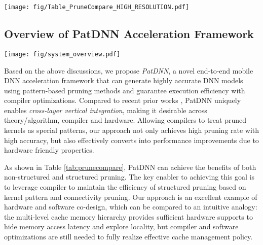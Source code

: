 \documentclass[sigplan,screen]{acmart}
\newcommand{\projectname}{PatDNN\xspace}
\begin{document}
\begin{table}\vspace{-5mm}
\caption{Qualitative comparison of different pruning schemes on accuracy and speedup under the same pruning rate.}\label{tab:prunecompare}
\centering
\texttt{[image: fig/Table\_PruneCompare\_HIGH\_RESOLUTION.pdf]}
\end{table}





\subsection{Overview of PatDNN Acceleration Framework}



\begin{figure*}\centering
    \texttt{[image: fig/system\_overview.pdf]}
    \caption{Overview of PatDNN acceleration framework.}
    \label{fig:system-overview}
\end{figure*}




Based on the above discussions, we propose
{\em \projectname}, a novel end-to-end mobile DNN acceleration framework that can generate highly accurate
DNN models using pattern-based pruning methods
and guarantee execution efficiency with 
compiler optimizations. 
Compared to recent prior works \cite{ren2019ADMMNN,he2018amc,he2017channel,wen2016learning},
\projectname uniquely enables 
{\em cross-layer vertical integration}, 
making it desirable across theory/algorithm,
compiler and hardware. 
Allowing compilers to treat 
pruned kernels as special patterns, 
our approach not only achieves high pruning rate
with high accuracy, 
but also effectively converts into performance 
improvements due to hardware friendly properties. 


As shown in {Table \ref{tab:prunecompare}}, \projectname can achieve the benefits of both non-structured and structured pruning. 
The key enabler to achieving this goal
is to leverage compiler to maintain the 
efficiency of structured pruning based on 
kernel pattern and connectivity pruning. 
Our approach is an excellent example of 
hardware and software co-design, which can be 
compared to an intuitive analogy:
the multi-level cache memory hierarchy provides
sufficient hardware supports to hide memory
access latency and explore locality, but 
compiler and software optimizations are still needed
to fully realize effective 
cache management policy. 
\end{document}
